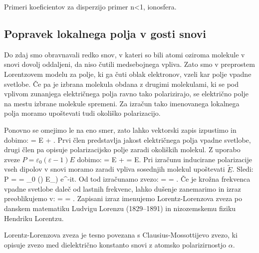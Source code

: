 \begin{example}
 Primeri koeficientov za disperzijo
 primer n<1, ionosfera.
\end{example}

\subsection*{Popravek lokalnega polja v gosti snovi}
Do zdaj smo obravnavali redko snov, v kateri so bili atomi oziroma molekule v snovi
dovolj oddaljeni, da niso čutili medsebojnega vpliva. 
Zato smo v preprostem Lorentzovem modelu za polje, ki ga čuti oblak elektronov, 
vzeli kar polje vpadne svetlobe. Če pa je izbrana molekula obdana z drugimi 
molekulami, ki se pod vplivom zunanjega električnega polja ravno tako polarizirajo, se  
električno polje na mestu izbrane molekule spremeni. Za izračun tako imenovanega 
lokalnega polja moramo upoštevati tudi okoliško polarizacijo.

Ponovno se omejimo le na eno smer, zato lahko vektorski zapis izpustimo in dobimo:
\beq
{} = E + .
\label{eq:09_31}
\eeq
Prvi člen predstavlja jakost električnega polja vpadne svetlobe, drugi člen 
pa opisuje polarizacijsko polje zaradi okoliških molekul. Z uporabo zveze
$P = \varepsilon_0 (\varepsilon -1) E$ dobimo:
\beq
{} = E +  = E.
\label{eq:09_32}
\eeq
Pri izračunu inducirane polarizacije vseh dipolov v snovi moramo zaradi 
vpliva sosednjih molekul upoštevati $\tilde{E}$. Sledi:
\beq
P =  = \varepsilon_0 () E_) e^{-i\omega t}.
\label{eq:09_33}
\eeq
Od tod izračunamo zvezo:
\beq
{} =  = 
.
\label{eq:09_34}
\eeq
Če je krožna frekvenca vpadne svetlobe daleč od lastnih frekvenc, lahko dušenje zanemarimo in 
izraz preoblikujemo v:
\beq
{} =  = 
.
\label{eq:09_35}
\eeq
Zapisani izraz imenujemo Lorentz-Lorenzova zveza po danskem matematiku Ludvigu Lorenzu 
(1829--1891) in nizozemskemu fiziku Hendriku Lorentzu. 
\begin{remark}
 Lorentz-Lorenzova zveza je tesno povezana s Clausius-Mossottijevo zvezo, ki opisuje
 zvezo med dielektrično konstanto snovi z atomsko polarizirnostjo $\alpha$.
\end{remark}

